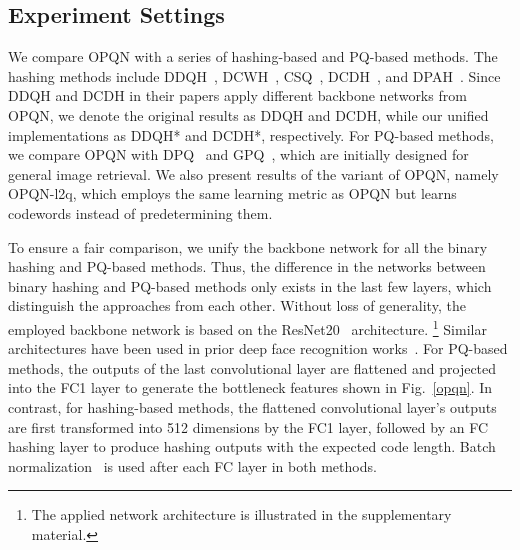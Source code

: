 \documentclass{elsarticle}
\begin{document}
\subsection{Experiment Settings}
We compare OPQN with a series of hashing-based and PQ-based methods. The hashing methods include DDQH~\cite{tang2018discriminative}, DCWH~\cite{zhe2019deep}, CSQ~\cite{Yuan_2020_CVPR}, DCDH~\cite{zhang2021deep}, and DPAH~\cite{wang2020deep}. 
Since DDQH and DCDH in their papers apply different backbone networks from OPQN, we denote the original results as DDQH and DCDH, while our unified implementations as DDQH* and DCDH*, respectively. For PQ-based methods, we compare OPQN with DPQ~\cite{klein2019end} and GPQ~\cite{jang2020generalized}, which are initially designed for general image retrieval. We also present results of the variant of OPQN, namely OPQN-l2q, which employs the same learning metric as OPQN but learns codewords instead of predetermining them.
\begin{comment}
\begin{figure}[htbp]
	\centering
	\texttt{[image: backbone]}
	\caption{The applied network architecture. `[Conv$3 \times3$@$\phi$]$\times \psi$' represents a number of stacked $\psi$ residual blocks with a kernel size of $3\times 3$ that output $\phi$-channel feature maps. The first convolutional layer of the first block applies a unit stride, or a stride of 2, depending on the input size, as separated by `/', respectively, while the first layers in other blocks were all performed with a stride of 2 for down-sampling.}
	\label{backbone}
\end{figure}
\end{comment}

To ensure a fair comparison, we unify the backbone network for all the binary hashing and PQ-based methods. Thus, the difference in the networks between binary hashing and PQ-based methods only exists in the last few layers, which distinguish the approaches from each other. Without loss of generality, the employed backbone network is based on the ResNet20~\cite{he2016deep} architecture. \footnote{The applied network architecture is illustrated in the supplementary material.}
Similar architectures have been used in prior deep face recognition works~\cite{wang2018cosface,deng2019arcface}. For PQ-based methods, the outputs of the last convolutional layer are flattened and projected into the FC1 layer to generate the bottleneck features shown in Fig.~\ref{opqn}. In contrast, for hashing-based methods, the flattened convolutional layer's outputs are first transformed into 512 dimensions by the FC1 layer, followed by an FC hashing layer to produce hashing outputs with the expected code length. Batch normalization~\cite{ioffe2015batch} is used after each FC layer in both methods.
\end{document}
